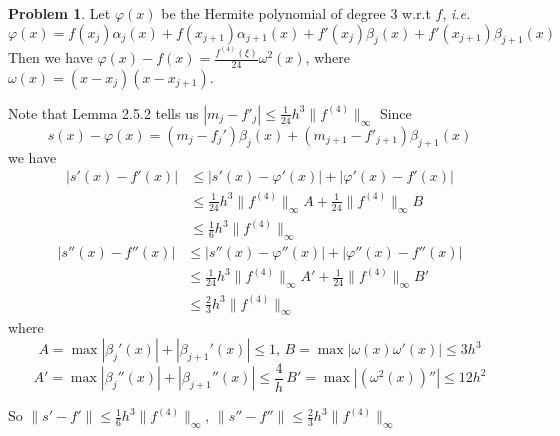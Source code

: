 \documentclass[a4paper]{article}
\theoremstyle{definition}
\newtheorem{problem}{Problem}
\theoremstyle{plain}
\newcommand{\dps}{\displaystyle}
\newcommand{\<}{\left<}
\renewcommand{\>}{\right>}
\numberwithin{equation}{problem}
\newcommand{\ie}{ \textit{ i.e. } }
\begin{document}
\begin{problem}
    
    Let  $ \varphi(x) $ be the Hermite polynomial of degree 3 w.r.t  $ f $, \ie 
    \[\varphi(x)=f(x_j)\alpha_j(x)+f(x_{j+1})\alpha_{j+1}(x)+f'(x_j)\beta_j(x)+f'(x_{j+1})\beta_{j+1}(x)\]
    Then we have  $ \varphi(x)-f(x)=\dps\frac{f^{(4)}(\xi )}{24}\omega^2(x) $, where   $ \omega(x)=(x-x_j)(x-x_{j+1}) $.

    Note that Lemma 2.5.2 tells us  $ |m_j-f'_j| \leq \dps\frac{1}{24}h^3\|f^{(4)}\|_\infty $ 
    Since 
    \[s(x)-\varphi(x)=(m_j-f_j')\beta_j(x)+(m_{j+1}-f'_{j+1})\beta_{j+1}(x)\]
    we have 
    \begin{align*}
        |s'(x)-f'(x)|& \leq |s'(x)-\varphi'(x)|+|\varphi'(x)-f'(x)|\\
        & \leq \frac{1}{24}h^3\|f^{(4)}\|_\infty A+\frac{1}{24}\|f^{(4)}\|_\infty B\\
        & \leq \frac{1}{6}h^3\|f^{(4)}\|_\infty
    \end{align*}
    \begin{align*}
        |s''(x)-f''(x)|& \leq |s''(x)-\varphi''(x)|+|\varphi''(x)-f''(x)|\\
        & \leq \frac{1}{24}h^3\|f^{(4)}\|_\infty A'+\frac{1}{24}\|f^{(4)}\|_\infty B'\\
        & \leq \frac{2}{3}h^3\|f^{(4)}\|_\infty
    \end{align*}
    where \[A=\max|\beta_j'(x)|+|\beta_{j+1}'(x)| \leq 1,\, B=\max|\omega(x)\omega'(x)| \leq 3h^3\]
    \[A'=\max|\beta_j''(x)|+|\beta_{j+1}''(x)| \leq \frac{4}{h}\, B'=\max|(\omega^2(x))''| \leq 12h^2\]

    So  $ \|s'-f'\| \leq \frac{1}{6}h^3\|f^{(4)}\|_\infty $,  $ \|s''-f''\| \leq \frac{2}{3}h^3\|f^{(4)}\|_\infty $ 

\end{problem}
\end{document}
